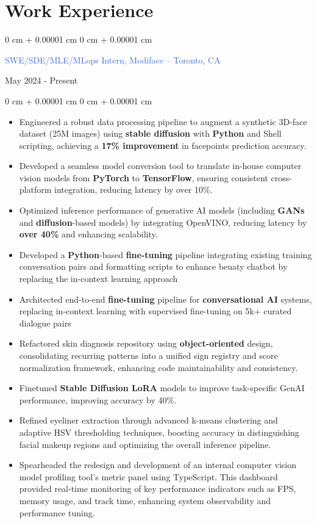 \documentclass[10pt, letterpaper]{article}
\newenvironment{highlights}{
    \begin{itemize}[
        topsep=0.10 cm,
        parsep=0.10 cm,
        partopsep=0pt,
        itemsep=0pt,
        leftmargin=0 cm + 10pt
    ]
}{
    \end{itemize}
}
\newenvironment{onecolentry}{
    \begin{adjustwidth}{
        0 cm + 0.00001 cm
    }{
        0 cm + 0.00001 cm
    }
}{
    \end{adjustwidth}
}
\newenvironment{twocolentry}[2][]{
    \onecolentry
    \def\secondColumn{#2}
    \setcolumnwidth{\fill, 4.5 cm}
    \begin{paracol}{2}
}{
    \switchcolumn \raggedleft \secondColumn
    \end{paracol}
    \endonecolentry
}
\begin{document}
\section{Work Experience}
\vspace{0.10 cm}
\begin{twocolentry}{May 2024 - Present}
    {\textcolor{royalblue}{SWE/SDE/MLE/MLops Intern, Modiface -- Toronto, CA}}
\end{twocolentry}
\vspace{0.05 cm}
\begin{onecolentry}
    \begin{highlights}
        \item Engineered a robust data processing pipeline to augment a synthetic 3D-face dataset (25M images) using \textbf{ stable diffusion} with \textbf{Python} and Shell scripting, achieving a \textbf{17\% improvement }in facepoints prediction accuracy.
        \item Developed a seamless model conversion tool to translate in-house computer vision models from \textbf{PyTorch} to \textbf{TensorFlow}, ensuring consistent cross-platform integration, reducing latency by over 10\%.
        \item Optimized inference performance of generative AI models (including \textbf{GANs} and \textbf{diffusion}-based models) by integrating OpenVINO, reducing latency by \textbf{over 40\%} and enhancing scalability.
        \item Developed a \textbf{Python}-based\textbf{ fine-tuning} pipeline integrating existing training conversation pairs and formatting scripts to enhance beuaty chatbot by replacing the in-context learning approach
        \item Architected end-to-end\textbf{ fine-tuning }pipeline for \textbf{conversational AI }systems, replacing in-context learning with supervised fine-tuning on 5k+ curated dialogue pairs
        \item  Refactored skin diagnosis repository using \textbf{object-oriented} design, consolidating recurring patterns into a unified sign registry and score normalization framework, enhancing code maintainability and consistency.
        \item Finetuned \textbf{Stable Diffusion LoRA} models to improve task-specific GenAI performance, improving accuracy by 40\%.
        \item Refined eyeliner extraction through advanced k-means clustering and adaptive HSV thresholding techniques, boosting accuracy in distinguishing facial makeup regions and optimizing the overall inference pipeline.
        \item Spearheaded the redesign and development of an internal computer vision model profiling tool's metric panel using TypeScript. This dashboard provided real-time monitoring of key performance indicators such as FPS, memory usage, and track time, enhancing system observability and performance tuning.    

    \end{highlights}
\end{onecolentry}
\end{document}
